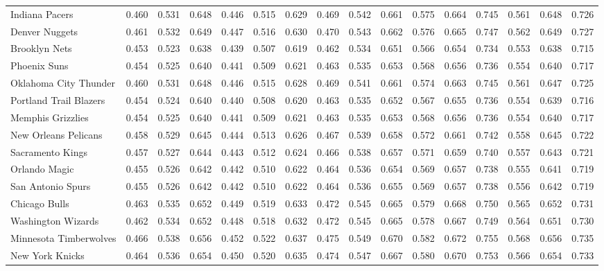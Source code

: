 \documentclass[11pt,a4paper]{article}
\begin{document}
\begin{table}[H]
\begin{tabular}{l ccc ccc ccc ccc ccc}
Indiana Pacers & 0.460 & 0.531 & 0.648 & 0.446 & 0.515 & 0.629 & 0.469 & 0.542 & 0.661 & 0.575 & 0.664 & 0.745 & 0.561 & 0.648 & 0.726 \\
Denver Nuggets & 0.461 & 0.532 & 0.649 & 0.447 & 0.516 & 0.630 & 0.470 & 0.543 & 0.662 & 0.576 & 0.665 & 0.747 & 0.562 & 0.649 & 0.727 \\
Brooklyn Nets & 0.453 & 0.523 & 0.638 & 0.439 & 0.507 & 0.619 & 0.462 & 0.534 & 0.651 & 0.566 & 0.654 & 0.734 & 0.553 & 0.638 & 0.715 \\
Phoenix Suns & 0.454 & 0.525 & 0.640 & 0.441 & 0.509 & 0.621 & 0.463 & 0.535 & 0.653 & 0.568 & 0.656 & 0.736 & 0.554 & 0.640 & 0.717 \\
Oklahoma City Thunder & 0.460 & 0.531 & 0.648 & 0.446 & 0.515 & 0.628 & 0.469 & 0.541 & 0.661 & 0.574 & 0.663 & 0.745 & 0.561 & 0.647 & 0.725 \\
Portland Trail Blazers & 0.454 & 0.524 & 0.640 & 0.440 & 0.508 & 0.620 & 0.463 & 0.535 & 0.652 & 0.567 & 0.655 & 0.736 & 0.554 & 0.639 & 0.716 \\
Memphis Grizzlies & 0.454 & 0.525 & 0.640 & 0.441 & 0.509 & 0.621 & 0.463 & 0.535 & 0.653 & 0.568 & 0.656 & 0.736 & 0.554 & 0.640 & 0.717 \\
New Orleans Pelicans & 0.458 & 0.529 & 0.645 & 0.444 & 0.513 & 0.626 & 0.467 & 0.539 & 0.658 & 0.572 & 0.661 & 0.742 & 0.558 & 0.645 & 0.722 \\
Sacramento Kings & 0.457 & 0.527 & 0.644 & 0.443 & 0.512 & 0.624 & 0.466 & 0.538 & 0.657 & 0.571 & 0.659 & 0.740 & 0.557 & 0.643 & 0.721 \\
Orlando Magic & 0.455 & 0.526 & 0.642 & 0.442 & 0.510 & 0.622 & 0.464 & 0.536 & 0.654 & 0.569 & 0.657 & 0.738 & 0.555 & 0.641 & 0.719 \\
San Antonio Spurs & 0.455 & 0.526 & 0.642 & 0.442 & 0.510 & 0.622 & 0.464 & 0.536 & 0.655 & 0.569 & 0.657 & 0.738 & 0.556 & 0.642 & 0.719 \\
Chicago Bulls & 0.463 & 0.535 & 0.652 & 0.449 & 0.519 & 0.633 & 0.472 & 0.545 & 0.665 & 0.579 & 0.668 & 0.750 & 0.565 & 0.652 & 0.731 \\
Washington Wizards & 0.462 & 0.534 & 0.652 & 0.448 & 0.518 & 0.632 & 0.472 & 0.545 & 0.665 & 0.578 & 0.667 & 0.749 & 0.564 & 0.651 & 0.730 \\
Minnesota Timberwolves & 0.466 & 0.538 & 0.656 & 0.452 & 0.522 & 0.637 & 0.475 & 0.549 & 0.670 & 0.582 & 0.672 & 0.755 & 0.568 & 0.656 & 0.735 \\
New York Knicks & 0.464 & 0.536 & 0.654 & 0.450 & 0.520 & 0.635 & 0.474 & 0.547 & 0.667 & 0.580 & 0.670 & 0.753 & 0.566 & 0.654 & 0.733 \\

\end{tabular}
\end{table}
\end{document}
